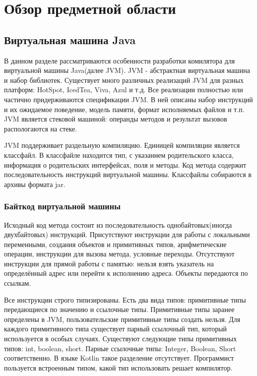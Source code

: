 \section{Обзор предметной области}
\subsection{Виртуальная машина Java}
В данном разделе рассматриваются особенности разработки комилятора для виртуальной машины Java(далее JVM). JVM - абстрактная виртуальная машина и набор библиотек. Существует много различных реализаций JVM для разных платформ: HotSpot, IcedTea, Viva, Azul и т.д. Все реализации полностью или частично придерживаются спецификации JVM. В ней описаны набор инструкций и их ожидаемое поведение, модель памяти, формат исполняемых файлов и т.п. JVM является стековой машиной: операнды методов и результат вызовов распологаются на стеке.

JVM поддерживает раздельную компиляцию. Единицей компиляции является классфайл. В классфайле находится тип, с указанием родительского класса, информация о родительских интерфейсах, поля и методы. Код метода содержит последовательность инструкций виртуальной машины. Классфайлы собираются в архивы формата jar.

\subsubsection{Байткод виртуальной машины}
Исходный код метода состоит из последовательность однобайтовых(иногда двухбайтовых) инструкций. Присутствуют инструкции для работы с локальными переменными, создания объектов и примитивных типов, арифметические операции, инструкции для вызова метода, условные переходы. Отсутствуют инструкции для прямой работы с памятью: нельзя взять указатель на определённый адрес или перейти к исполнению адреса. Объекты передаются по ссылкам.

Все инструкции строго типизированы. Есть два вида типов: примитивные типы передающиеся по значению и ссылочные типы. Примитивные типы заранее определены в JVM, пользовательские примитивные типы создать нельзя. Для каждого примитивного типа существует парный ссылочный тип, который используется в особых случаях. Существуют следующие типы примитивных типов: int, boolean, short. Парные ссылочные типы: Integer, Boolean, Short соответственно. В языке Kotlin такое разделение отсутствует. Программист пользуется встроенным типом, какой тип использовать решает компилятор.

